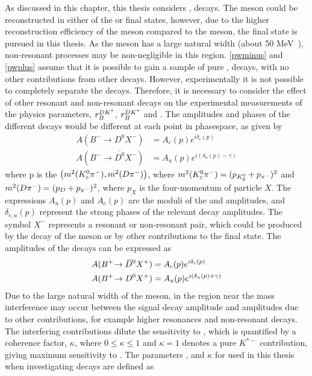 As discussed in this chapter, this thesis considers \decay{\Bm}{\D\Kstarm}, \decay{\Kstarm}{\KS\pim} decays. The \Kstarm meson could be reconstructed in either of the \KS\piz or \Km\piz final states, however, due to the higher reconstruction efficiency of the \KS meson compared to the \piz meson, the \KS\pim final state is pursued in this thesis. As the \Kstarm meson has a large natural width (about 50 MeV~\cite{PDG2016}), non-resonant \decay{\Bm}{\D\KS\pim} processes may be non-negligible in this region. \eqn\ref{pwminus} and \ref{pwplus} assume that it is possible to gain a sample of pure \decay{\Bm}{\D\Kstarm}, \decay{\Kstarm}{\KS\pim} decays, with no other contributions from other \decay{\Bm}{\D\KS\pim} decays. However, experimentally it is not possible to completely separate the \decay{\Bm}{\D\Kstarm} decays. Therefore, it is necessary to consider the effect of other resonant and non-resonant \decay{\Bm}{\D\KS\pim} decays on the experimental measurements of the physics parameters, $r_B^{DK^*}$, $r_B^{DK^*}$ and \Pgamma. The amplitudes and phases of the different decays would be different at each point in \decay{\Bm}{\D\KS\pim} phasespace, as given by
\begin{align*}
A(B^- \to D^0 X^-) &= A_c(p) e^{i\delta_c(p)} \\
A(B^- \to \bar{D^0} X^-) &= A_u(p) e^{i(\delta_u(p) - \gamma)}
\end{align*}
where p is the $\left(m^2({{K}^0_{\mathrm{ \scriptscriptstyle S}}}{{\pi}^-}),m^2({D}{{\pi}^-})\right)$, where $m^2({{K}^0_{\mathrm{ \scriptscriptstyle S}}}{{\pi}^-}) = (p_{{{K}^0_{\mathrm{ \scriptscriptstyle S}}}} + p_{{{\pi}^-}})^2$ and $m^2({D}{{\pi}^-}) = (p_{{D}} + p_{{{\pi}^-}})^2$, where $p_{X}$ is the four-momentum of particle $X$. The expressions $A_u(p)$ and $A_c(p)$ are the moduli of the \decay{\bquark}{\uquark} and \decay{\bquark}{\cquark} amplitudes, and $\delta_{c,u}(p)$ represent the strong phases of the relevant decay amplitudes. The symbol $X^-$ represents a resonant or non-resonant \KS\pim pair, which could be produced by the decay of the \Kstarm meson or by other contributions to the \decay{\Bm}{\D\KS\pim} final state. The amplitudes of the \Bp decays can be expressed as 
\begin{align*}
A({{{B}^+}}\!\rightarrow {\ensuremath{{\kern 0.2em\overline{\kern -0.2em D}{}}{}^0}} X^+) &= A_c(p) e^{i\delta_c(p)} \\
A({{{B}^+}}\!\rightarrow {\ensuremath{{D}^0}} X^+) &= A_u(p) e^{i(\delta_u(p) + \gamma)}
\end{align*}
Due to the large natural width of the \Kstarm meson, in the region near the \Kstarm mass interference may occur between the signal \Kstarm decay amplitude and amplitudes due to other \decay{\Bm}{\D\KS\pim} contributions, for example higher \KS\pim resonances and non-resonant decays. The interfering contributions dilute the sensitivity to \Pgamma, which is quantified by a coherence factor, $\kappa$, where $0 \leq \kappa \leq 1$ and $\kappa = 1$ denotes a pure $K^{*-}$ contribution, giving maximum sensitivity to \Pgamma. The parameters \rb, \deltab and $\kappa$ for used in this thesis when investigating \btodkst decays are defined as
